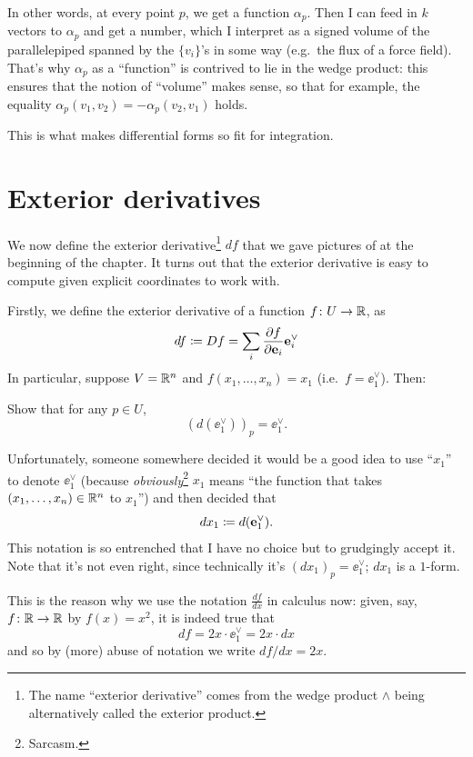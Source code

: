 In other words, at every point $p$, we get a function $\alpha_p$.
Then I can feed in $k$ vectors to $\alpha_p$ and get a number,
which I interpret as a signed volume of the parallelepiped spanned by the $\{v_i\}$'s
in some way (e.g.\ the flux of a force field).
That's why $\alpha_p$ as a ``function'' is contrived to lie in the wedge product:
this ensures that the notion of ``volume'' makes sense, so that for example,
the equality $\alpha_p(v_1, v_2) = -\alpha_p(v_2, v_1)$ holds.

This is what makes differential forms so fit for integration.

\section{Exterior derivatives}
We now define the exterior derivative\footnote{The name ``exterior derivative'' comes from the wedge
product $\wedge$ being alternatively called the exterior product.} $df$ that we gave
pictures of at the beginning of the chapter.
It turns out that the exterior derivative is easy to compute
given explicit coordinates to work with.

Firstly, we define the exterior derivative
of a function $f \colon U \to \mathbb R$, as
\[ df \coloneqq Df = \sum_i \frac{\partial f}{\partial \mathbf e_i} \mathbf e_i^\vee \]
In particular, suppose $V = \mathbb R^n$ and $f(x_1, \dots, x_n) = x_1$
(i.e.\ $f = \ee_1^\vee$). Then:
\begin{ques}
	Show that for any $p \in U$, \[ \left( d(\ee_1^\vee) \right)_p = \ee_1^\vee. \]
\end{ques}

\begin{abuse}
	Unfortunately, someone somewhere decided
	it would be a good idea to use ``$x_1$'' to denote $\ee_1^\vee$
	(because \emph{obviously}\footnote{Sarcasm.} $x_1$ means
	``the function that takes $(x_1, \dots, x_n) \in \mathbb R^n$ to $x_1$'')
	and then decided that \[ dx_1 \coloneqq d(\mathbf e_1^\vee). \]
	This notation is so entrenched that I have no choice
	but to grudgingly accept it.
	Note that it's not even right,
	since technically it's $(dx_1)_p = \ee_1^\vee$; $dx_1$ is a $1$-form.
	\label{abuse:dx}
\end{abuse}
\begin{remark}
	This is the reason why we use the notation $\frac{df}{dx}$ in calculus now:
	given, say, $f \colon \mathbb R \to \mathbb R$ by $f(x) = x^2$, it is indeed true that
	\[ df = 2x \cdot \ee_1^\vee = 2x \cdot dx \]
	and so by (more) abuse of notation we write $df/dx = 2x$.
\end{remark}


